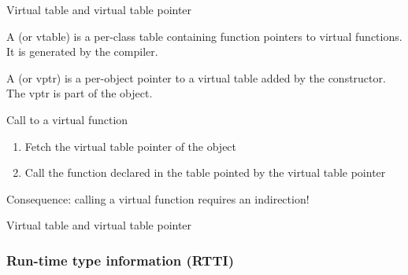 \begin{frame}{Virtual table and virtual table pointer}{}
  \begin{definition}
    A  (or vtable) is a per-class table containing function pointers to virtual functions. It is generated by the compiler.
  \end{definition}

  \begin{definition}
    A  (or vptr) is a per-object pointer to a virtual table added by the constructor. The vptr is part of the object.
  \end{definition}

  \begin{block}{Call to a virtual function}
    \begin{enumerate}
    \item
      Fetch the virtual table pointer of the object
    \item
      Call the function declared in the table pointed by the virtual table pointer
    \end{enumerate}
    Consequence: calling a virtual function requires an indirection!
  \end{block}
\end{frame}

\begin{frame}{Virtual table and virtual table pointer}{}
  \begin{example}
  \end{example}
\end{frame}

\subsubsection{Run-time type information (RTTI)}

